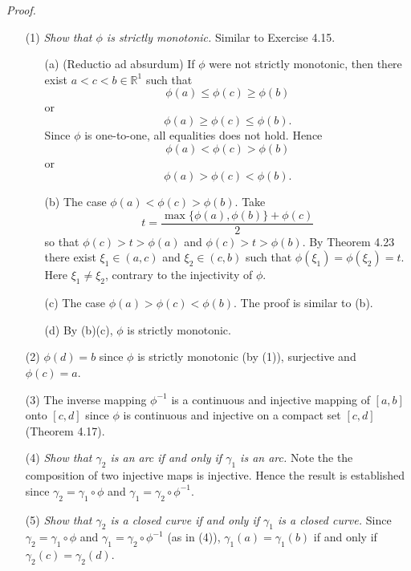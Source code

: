 \documentclass{article}
\begin{document}
\emph{Proof.}
\begin{enumerate}
  \item[(1)]
  \emph{Show that $\phi$ is strictly monotonic.}
  Similar to Exercise 4.15.
  \begin{enumerate}
    \item[(a)]
    (Reductio ad absurdum)
    If $\phi$ were not strictly monotonic,
    then there exist $a < c < b \in \mathbb{R}^1$ such that
    \[
      \phi(a) \leq \phi(c) \geq \phi(b)
    \]
    or
    \[
      \phi(a) \geq \phi(c) \leq \phi(b).
    \]
    Since $\phi$ is one-to-one, all equalities does not hold.
    Hence
    \[
      \phi(a) < \phi(c) > \phi(b)
    \]
    or
    \[
      \phi(a) > \phi(c) < \phi(b).
    \]

    \item[(b)]
    The case $\phi(a) < \phi(c) > \phi(b)$.
    Take
    \[
      t = \frac{\max\{\phi(a),\phi(b)\} + \phi(c)}{2}
    \]
    so that $\phi(c) > t > \phi(a)$ and $\phi(c) > t > \phi(b)$.
    By Theorem 4.23 there exist $\xi_1 \in (a,c)$ and $\xi_2 \in(c,b)$
    such that $\phi(\xi_1) = \phi(\xi_2) = t$.
    Here $\xi_1 \neq \xi_2$, contrary to the injectivity of $\phi$.

    \item[(c)]
    The case $\phi(a) > \phi(c) < \phi(b)$.
    The proof is similar to (b).

    \item[(d)]
    By (b)(c), $\phi$ is strictly monotonic.
  \end{enumerate}

  \item[(2)]
  $\phi(d) = b$
  since $\phi$ is strictly monotonic (by (1)), surjective and $\phi(c) = a$.

  \item[(3)]
  The inverse mapping $\phi^{-1}$ is a continuous and injective mapping of $[a,b]$ onto $[c,d]$
  since $\phi$ is continuous and injective on a compact set $[c,d]$ (Theorem 4.17).

  \item[(4)]
  \emph{Show that $\gamma_2$ is an arc if and only if $\gamma_1$ is an arc.}
  Note the the composition of two injective maps is injective.
  Hence the result is established since
  $\gamma_2 = \gamma_1 \circ \phi$ and $\gamma_1 = \gamma_2 \circ \phi^{-1}$.

  \item[(5)]
  \emph{Show that $\gamma_2$ is a closed curve if and only if $\gamma_1$ is a closed curve.}
  Since $\gamma_2 = \gamma_1 \circ \phi$ and $\gamma_1 = \gamma_2 \circ \phi^{-1}$
  (as in (4)),
  $\gamma_1(a) = \gamma_1(b)$ if and only if $\gamma_2(c) = \gamma_2(d)$.


\end{enumerate}
\end{document}
